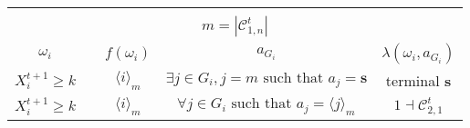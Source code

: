 \documentclass[12pt,letter]{article}
\newcommand{\Kappa}{\mathcal{C}}
\theoremstyle{definition}
\theoremstyle{remark}
\theoremstyle{claim}
\begin{document}
\begin{table}[!htbp]
\begin{center}
\begin{tabular}{c c | c | c | c}
\hline
\\
\multicolumn{5}{c}{$m= |\Kappa^t_{1,n}|$}\\
$\omega_i$ 	 & 	   &	$f(\omega_i)$  &	$a_{G_i}$ & $\lambda(\omega_i,a_{G_i})$ \\
\hline
\hline
$X^{t+1}_i\geq k$ 	& 						& $\langle i \rangle_m$		&  $\exists j\in G_i, j=m\text{ such that } a_j=\textbf{s}$	& terminal \textbf{s}\\
$X^{t+1}_i\geq k$ 	& 						& $\langle i \rangle_m$		&  $\forall j\in G_i\text{ such that } a_j= \langle j \rangle_m$	& $1\dashv \Kappa^t_{2,1}$\\
\hline
\end{tabular}
\end{center}
\end{table}


\clearpage
\end{document}
